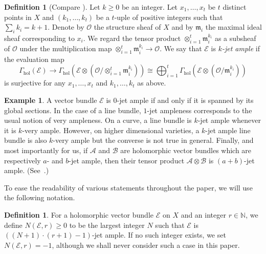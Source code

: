 \documentclass[a4paper]{amsart}
\newcommand{\bN}{\mathbb N}
\newcommand{\cA}{\mathcal A}
\newcommand{\cB}{\mathcal B}
\newcommand{\cE}{\mathcal E}
\newcommand{\cO}{\mathcal O}
\newcommand{\fm}{\mathfrak m}
\newcommand{\lra}{\longrightarrow}
\theoremstyle{plain}
\theoremstyle{definition}
\newtheorem{definition}[theorem]{Definition}
\newtheorem{example}[theorem]{Example}
\newcommand{\Gammahol}{\Gamma_{\mathrm{hol}}}
\begin{document}
\begin{definition}[Compare \cite{beltrametti_generation_1999}]
Let $k \geq 0$ be an integer. Let $x_1, \ldots, x_t$ be $t$ distinct points in $X$ and $(k_1,\ldots,k_t)$ be a $t$-uple of positive integers such that $\sum_i k_i = k+1$. Denote by $\cO$ the structure sheaf of $X$ and by $\fm_i$ the maximal ideal sheaf corresponding to $x_i$. We regard the tensor product $\otimes_{i=1}^t \fm_i^{k_i}$ as a subsheaf of $\cO$ under the multiplication map $\otimes_{i=1}^t \fm_i^{k_i} \to \cO$. We say that $\cE$ is \emph{$k$-jet ample} if the evaluation map
\[
    \Gammahol\left(\cE\right) \lra \Gammahol\left(\cE \otimes \left(\cO / \otimes_{i=1}^t \fm_i^{k_i}\right)\right) \cong \bigoplus_{i=1}^t \Gammahol\left(\cE \otimes \left(\cO / \fm_i^{k_i}\right)\right)
\]
is surjective for any $x_1,\ldots,x_t$ and $k_1,\ldots,k_t$ as above.
\end{definition}

\begin{example}\label{example:jetampleness}
A vector bundle $\cE$ is $0$-jet ample if and only if it is spanned by its global sections. In the case of a line bundle, $1$-jet ampleness corresponds to the usual notion of very ampleness. On a curve, a line bundle is $k$-jet ample whenever it is $k$-very ample. However, on higher dimensional varieties, a $k$-jet ample line bundle is also $k$-very ample but the converse is not true in general. Finally, and most importantly for us, if $\cA$ and $\cB$ are holomorphic vector bundles which are respectively $a$- and $b$-jet ample, then their tensor product $\cA \otimes \cB$ is $(a+b)$-jet ample. (See~\cite[Proposition 2.3]{beltrametti_generation_1999}.)
\end{example}

To ease the readability of various statements throughout the paper, we will use the following notation.

\begin{definition}\label{def:bigN}
For a holomorphic vector bundle $\cE$ on $X$ and an integer $r \in \bN$, we define $N(\cE,r) \geq 0$ to be the largest integer $N$ such that $\cE$ is $\left( (N+1) \cdot (r+1) - 1\right)$-jet ample. If no such integer exists, we set $N(\cE,r) = - 1$, although we shall never consider such a case in this paper.
\end{definition}
\end{document}
